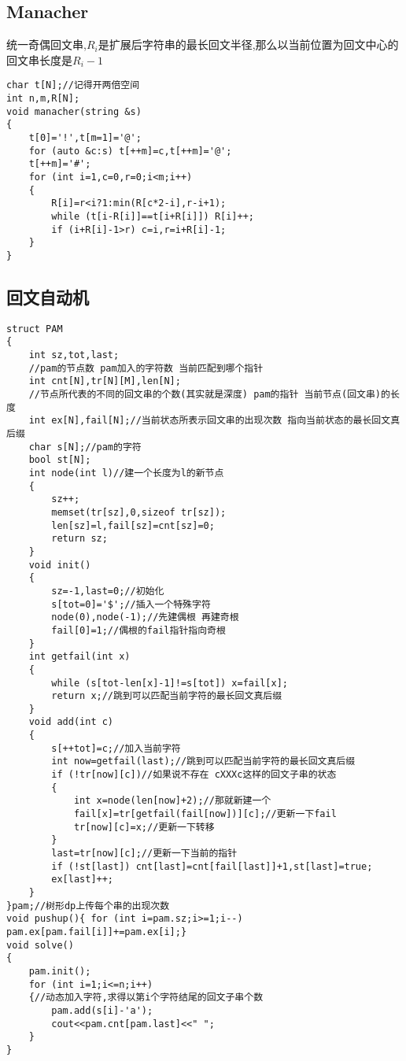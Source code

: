 \documentclass[a4paper]{ctexart}
\begin{document}
\subsection{Manacher}

统一奇偶回文串,$R_i$是扩展后字符串的最长回文半径,那么以当前位置为回文中心的回文串长度是$R_i-1$

\begin{lstlisting}
char t[N];//记得开两倍空间
int n,m,R[N];
void manacher(string &s)
{
    t[0]='!',t[m=1]='@';
    for (auto &c:s) t[++m]=c,t[++m]='@';
    t[++m]='#';
    for (int i=1,c=0,r=0;i<m;i++)
    {
        R[i]=r<i?1:min(R[c*2-i],r-i+1);
        while (t[i-R[i]]==t[i+R[i]]) R[i]++;
        if (i+R[i]-1>r) c=i,r=i+R[i]-1;
    }
}
\end{lstlisting}

\subsection{回文自动机}

\begin{lstlisting}
struct PAM
{
    int sz,tot,last;
    //pam的节点数 pam加入的字符数 当前匹配到哪个指针
    int cnt[N],tr[N][M],len[N];
    //节点所代表的不同的回文串的个数(其实就是深度) pam的指针 当前节点(回文串)的长度 
    int ex[N],fail[N];//当前状态所表示回文串的出现次数 指向当前状态的最长回文真后缀
    char s[N];//pam的字符
    bool st[N];
    int node(int l)//建一个长度为l的新节点
    {
        sz++;
        memset(tr[sz],0,sizeof tr[sz]);
        len[sz]=l,fail[sz]=cnt[sz]=0;
        return sz;
    }
    void init()
    {
        sz=-1,last=0;//初始化
        s[tot=0]='$';//插入一个特殊字符
        node(0),node(-1);//先建偶根 再建奇根
        fail[0]=1;//偶根的fail指针指向奇根
    }
    int getfail(int x)
    {
        while (s[tot-len[x]-1]!=s[tot]) x=fail[x];
        return x;//跳到可以匹配当前字符的最长回文真后缀
    }
    void add(int c)
    {
        s[++tot]=c;//加入当前字符
        int now=getfail(last);//跳到可以匹配当前字符的最长回文真后缀
        if (!tr[now][c])//如果说不存在 cXXXc这样的回文子串的状态
        {
            int x=node(len[now]+2);//那就新建一个
            fail[x]=tr[getfail(fail[now])][c];//更新一下fail
            tr[now][c]=x;//更新一下转移
        }
        last=tr[now][c];//更新一下当前的指针
        if (!st[last]) cnt[last]=cnt[fail[last]]+1,st[last]=true;
        ex[last]++;
    }
}pam;//树形dp上传每个串的出现次数
void pushup(){ for (int i=pam.sz;i>=1;i--) pam.ex[pam.fail[i]]+=pam.ex[i];}
void solve()
{
    pam.init();
    for (int i=1;i<=n;i++)
    {//动态加入字符,求得以第i个字符结尾的回文子串个数
        pam.add(s[i]-'a');
        cout<<pam.cnt[pam.last]<<" ";
    }
}
\end{lstlisting}
\end{document}
